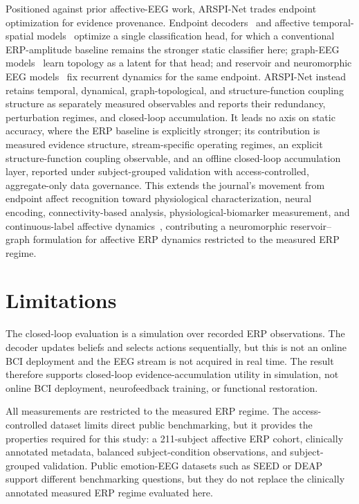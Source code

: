 \documentclass[journal]{IEEEtran}
\begin{document}
Positioned against prior affective-EEG work, ARSPI-Net trades endpoint optimization for evidence provenance. Endpoint decoders~\cite{lawhern2018eegnet,ding2024eegdeformer} and affective temporal-spatial models~\cite{ding2023tsception} optimize a single classification head, for which a conventional ERP-amplitude baseline remains the stronger static classifier here; graph-EEG models~\cite{zhong2022rgnn,klepl2024gnn} learn topology as a latent for that head; and reservoir and neuromorphic EEG models~\cite{fourati2018reservoir,gong2023sglnet,cai2024spiking} fix recurrent dynamics for the same endpoint. ARSPI-Net instead retains temporal, dynamical, graph-topological, and structure-function coupling structure as separately measured observables and reports their redundancy, perturbation regimes, and closed-loop accumulation. It leads no axis on static accuracy, where the ERP baseline is explicitly stronger; its contribution is measured evidence structure, stream-specific operating regimes, an explicit structure-function coupling observable, and an offline closed-loop accumulation layer, reported under subject-grouped validation with access-controlled, aggregate-only data governance. This extends the journal's movement from endpoint affect recognition toward physiological characterization, neural encoding, connectivity-based analysis, physiological-biomarker measurement, and continuous-label affective dynamics~\cite{pan2026encoding,kumar2026nasal,jiang2025seedvii}, contributing a neuromorphic reservoir--graph formulation for affective ERP dynamics restricted to the measured ERP regime.

\section{Limitations}
The closed-loop evaluation is a simulation over recorded ERP observations. The decoder updates beliefs and selects actions sequentially, but this is not an online BCI deployment and the EEG stream is not acquired in real time. The result therefore supports closed-loop evidence-accumulation utility in simulation, not online BCI deployment, neurofeedback training, or functional restoration.

All measurements are restricted to the measured ERP regime. The access-controlled dataset limits direct public benchmarking, but it provides the properties required for this study: a 211-subject affective ERP cohort, clinically annotated metadata, balanced subject-condition observations, and subject-grouped validation. Public emotion-EEG datasets such as SEED or DEAP support different benchmarking questions, but they do not replace the clinically annotated measured ERP regime evaluated here.
\end{document}
